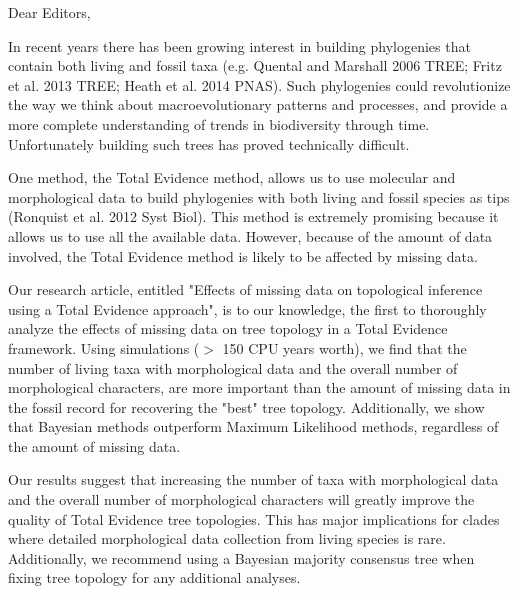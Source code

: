 \documentclass[11pt]{letter}
\begin{document}
\begin{letter}{}
\opening{Dear Editors,}

In recent years there has been growing interest in building phylogenies that contain both living and fossil taxa (e.g. Quental and Marshall 2006 TREE; Fritz et al. 2013 TREE; Heath et al. 2014 PNAS). Such phylogenies could revolutionize the way we think about macroevolutionary patterns and processes, and provide a more complete understanding of trends in biodiversity through time. Unfortunately building such trees has proved technically difficult. 

One method, the Total Evidence method, allows us to use molecular and morphological data to build phylogenies with both living and fossil species as tips (Ronquist et al. 2012 Syst Biol). This method is extremely promising because it allows us to use all the available data. However, because of the amount of data involved, the Total Evidence method is likely to be affected by missing data.

Our research article, entitled "Effects of missing data on topological inference using a Total Evidence approach", is to our knowledge, the first to thoroughly analyze the effects of missing data on tree topology in a Total Evidence framework. Using simulations ($>$ 150 CPU years worth), we find that the number of living taxa with morphological data and the overall number of morphological characters, are more important than the amount of missing data in the fossil record for recovering the "best" tree topology. Additionally, we show that Bayesian methods outperform Maximum Likelihood methods, regardless of the amount of missing data.

Our results suggest that increasing the number of taxa with morphological data and the overall number of morphological characters will greatly improve the quality of Total Evidence tree topologies. This has major implications for clades where detailed morphological data collection from living species is rare. Additionally, we recommend using a Bayesian majority consensus tree when fixing tree topology for any additional analyses.



\end{letter}
\end{document}
